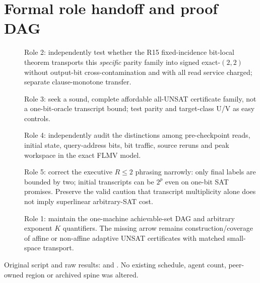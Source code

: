 \documentclass[11pt]{article}
\begin{document}
\section{Formal role handoff and proof DAG}
\begin{description}
\item[] Role 2: independently test whether the R15 fixed-incidence bit-local theorem transports this \emph{specific} parity family into signed exact-$(2,2)$ without output-bit cross-contamination and with all read service charged; separate clause-monotone transfer.
\item[] Role 3: seek a sound, complete affordable all-UNSAT certificate family, not a one-bit-oracle transcript bound; test parity and target-class U/V as easy controls.
\item[] Role 4: independently audit the distinctions among pre-checkpoint reads, initial state, query-address bits, bit traffic, source reruns and peak workspace in the exact FLMV model.
\item[] Role 5: correct the executive $R\le2$ phrasing narrowly: only final labels are bounded by two; initial transcripts can be $2^p$ even on one-bit SAT promises. Preserve the valid caution that transcript multiplicity alone does not imply superlinear arbitrary-SAT cost.
\item[] Role 1: maintain the one-machine achievable-set DAG and arbitrary exponent $K$ quantifiers. The missing arrow remains construction/coverage of affine or non-affine adaptive UNSAT certificates with matched small-space transport.
\end{description}

Original script and raw results:  and . No existing schedule, agent count, peer-owned region or archived spine was altered.



\end{document}
